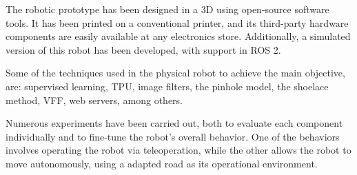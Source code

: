 The robotic prototype has been designed in a 3D using open-source software tools. It has been printed on a conventional printer, and its third-party hardware components are easily available at any electronics store. Additionally, a simulated version of this robot has been developed, with support in ROS 2.


Some of the techniques used in the physical robot to achieve the main objective, are: supervised learning, \ac{TPU}, image filters, the pinhole model, the shoelace method, \ac{VFF}, web servers, among others.


Numerous experiments have been carried out, both to evaluate each component individually and to fine-tune the robot's overall behavior. One of the behaviors involves operating the robot via teleoperation, while the other allows the robot to move autonomously, using a adapted road as its operational environment. 
